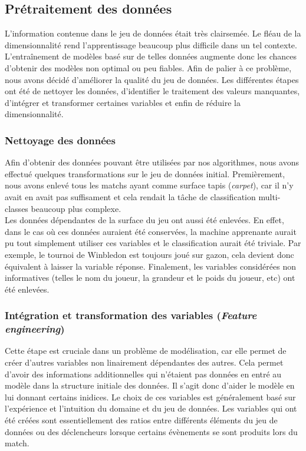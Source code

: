 \subsection{Prétraitement des données}
L'information contenue dans le jeu de données était très clairsemée. Le fléau de la dimensionnalité rend l'apprentissage beaucoup plus difficile dans un tel contexte. L'entraînement de modèles basé sur de telles données augmente donc les chances d'obtenir des modèles non optimal ou peu fiables. Afin de palier à ce problème, nous avons décidé d'améliorer la qualité du jeu de données. Les différentes étapes ont été de nettoyer les données, d'identifier le traitement des valeurs manquantes, d'intégrer et transformer certaines variables et enfin de réduire la dimensionnalité.

\subsubsection{Nettoyage des données}
Afin d'obtenir des données pouvant être utilisées par nos algorithmes, nous avons effectué quelques transformations sur le jeu de données initial. Premièrement, nous avons enlevé tous les matchs ayant comme surface tapis (\textit{carpet}), car il n'y avait en avait pas suffisament et cela rendait la tâche de classification multi-classes beaucoup plus complexe. \\

 Les données dépendantes de la surface du jeu ont aussi été enlevées. En effet, dans le cas où ces données auraient été conservées, la machine apprenante aurait pu tout simplement utiliser ces variables et le classification aurait été triviale. Par exemple, le tournoi de Winbledon est toujours joué sur gazon, cela devient donc équivalent à laisser la variable réponse. Finalement, les variables considérées non informatives (telles le nom du joueur, la grandeur et le poids du joueur, etc) ont été enlevées.

\subsubsection{Intégration et transformation des variables (\textit{Feature engineering})}
Cette étape est cruciale dans un problème de modélisation, car elle permet de créer d'autres variables non linairement dépendantes des autres. Cela permet d'avoir des informations additionnelles qui n'étaient pas données en entré au modèle dans la structure initiale des données. Il s'agit donc d'aider le modèle en lui donnant certains inidices. Le choix de ces variables est généralement basé sur l'expérience et l'intuition du domaine et du jeu de données. Les variables qui ont été créées sont essentiellement des ratios entre différents éléments du jeu de données ou des déclencheurs lorsque certains évènements se sont produits lors du match.\\

